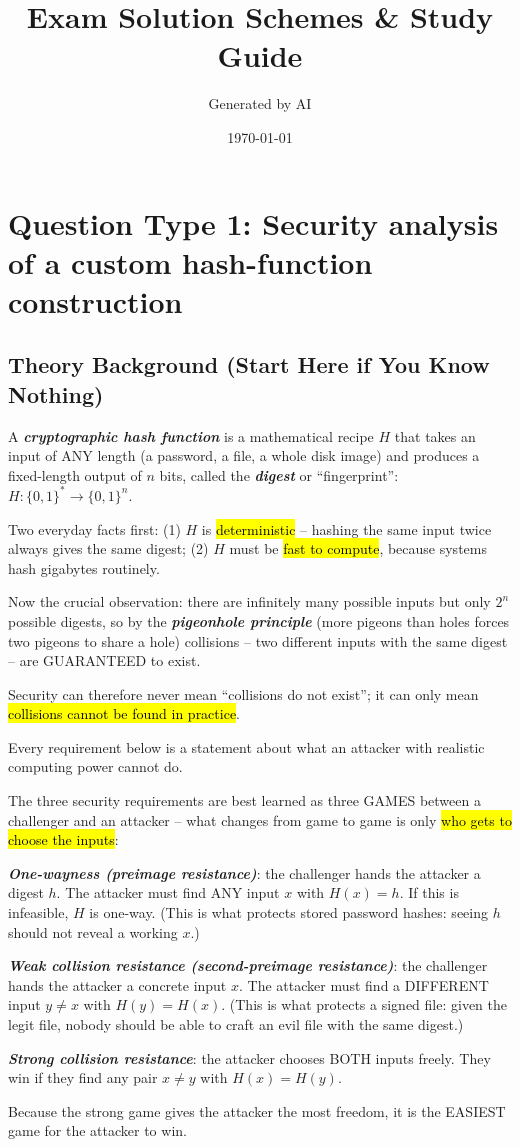 \documentclass[12pt, a4paper]{article}
\newcommand{\term}[1]{\textbf{\textit{#1}}}        %
\newcommand{\imp}[1]{\hl{#1}}                       %
\begin{document}
\title{Exam Solution Schemes \& Study Guide}
\author{Generated by AI}
\date{\today}
\maketitle
\tableofcontents
\newpage

\section{Question Type 1: Security analysis of a custom hash-function construction}

\subsection*{Theory Background (Start Here if You Know Nothing)}

A \term{cryptographic hash function} is a mathematical recipe $H$ that takes an input of ANY length (a password, a file, a whole disk image) and produces a fixed-length output of $n$ bits, called the \term{digest} or ``fingerprint'': $H : \{0,1\}^{*} \rightarrow \{0,1\}^{n}$.

Two everyday facts first: (1) $H$ is \imp{deterministic} -- hashing the same input twice always gives the same digest; (2) $H$ must be \imp{fast to compute}, because systems hash gigabytes routinely.

Now the crucial observation: there are infinitely many possible inputs but only $2^{n}$ possible digests, so by the \term{pigeonhole principle} (more pigeons than holes forces two pigeons to share a hole) collisions -- two different inputs with the same digest -- are GUARANTEED to exist.

Security can therefore never mean ``collisions do not exist''; it can only mean \imp{collisions cannot be found in practice}.

Every requirement below is a statement about what an attacker with realistic computing power cannot do.

The three security requirements are best learned as three GAMES between a challenger and an attacker -- what changes from game to game is only \imp{who gets to choose the inputs}:
\begin{tightitem}
    \item \term{One-wayness (preimage resistance)}: the challenger hands the attacker a digest $h$. The attacker must find ANY input $x$ with $H(x) = h$. If this is infeasible, $H$ is one-way. (This is what protects stored password hashes: seeing $h$ should not reveal a working $x$.)
    \item \term{Weak collision resistance (second-preimage resistance)}: the challenger hands the attacker a concrete input $x$. The attacker must find a DIFFERENT input $y \neq x$ with $H(y) = H(x)$. (This is what protects a signed file: given the legit file, nobody should be able to craft an evil file with the same digest.)
    \item \term{Strong collision resistance}: the attacker chooses BOTH inputs freely. They win if they find any pair $x \neq y$ with $H(x) = H(y)$.
\end{tightitem}
Because the strong game gives the attacker the most freedom, it is the EASIEST game for the attacker to win.
\end{document}
